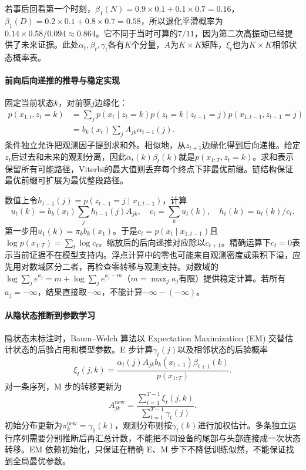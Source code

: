 若事后回看第一个时刻，$\beta_1(N)=0.9\times0.1+0.1\times0.7=0.16$，$\beta_1(D)=0.2\times0.1+0.8\times0.7=0.58$，所以退化平滑概率为$0.14\times0.58/0.094\approx0.864$。它不同于当时可算的$7/11$，因为第二次高振动已经提供了未来证据。此处$\alpha_t,\beta_t,\gamma_t$各有$K$个分量，$A$为$K\times K$矩阵，$\xi_t$也为$K\times K$相邻状态概率表。

\paragraph{前向后向递推的推导与稳定实现}
固定当前状态$k$，对前驱$j$边缘化：
\begin{align}
 p(x_{1:t},z_t=k)
 &=\sum_jp(x_t\mid z_t=k)p(z_t=k\mid z_{t-1}=j)
             p(x_{1:t-1},z_{t-1}=j)\\
 &=b_k(x_t)\sum_jA_{jk}\alpha_{t-1}(j).
\end{align}
条件独立允许把观测因子提到求和外。相似地，从$z_{t+1}$边缘化得到后向递推。给定$z_t$后过去和未来的观测分离，因此$\alpha_t(k)\beta_t(k)$就是$p(x_{1:T},z_t=k)$。求和表示保留所有可能路径，Viterbi的最大值则丢弃每个终点下非最优前缀。链结构保证最优前缀可扩展为最优整段路径。

数值上令$h_{t-1}(j)=p(z_{t-1}=j\mid x_{1:t-1})$，计算
\begin{equation}
 u_t(k)=b_k(x_t)\sum_jh_{t-1}(j)A_{jk},\quad
 c_t=\sum_ku_t(k),\quad h_t(k)=u_t(k)/c_t.
\end{equation}
第一步用$u_1(k)=\pi_kb_k(x_1)$。于是$c_t=p(x_t\mid x_{1:t-1})$且$\log p(x_{1:T})=\sum_t\log c_t$。缩放后的后向递推对应除以$c_{t+1}$。精确运算下$c_t=0$表示当前证据不在模型支持内。浮点计算中的零也可能来自观测密度或乘积下溢，应先用对数域区分二者，再检查零转移与观测支持。对数域的$\log\sum_j e^{a_j}=m+\log\sum_je^{a_j-m}$（$m=\max_ja_j$有限）提供稳定计算。若所有$a_j=-\infty$，结果直接取$-\infty$，不能计算$-\infty-(-\infty)$。

\paragraph{从隐状态推断到参数学习}
隐状态未标注时，Baum--Welch 算法以 Expectation Maximization (EM) 交替估计状态的后验占用和模型参数。E 步计算$\gamma_t(j)$以及相邻状态的后验概率
\begin{equation}
 \xi_t(j,k)=\frac{\alpha_t(j)A_{jk}b_k(x_{t+1})\beta_{t+1}(k)}{p(x_{1:T})}.
\end{equation}
对一条序列，M 步的转移更新为
\begin{equation}
 A_{jk}^{\mathrm{new}}=
 \frac{\sum_{t=1}^{T-1}\xi_t(j,k)}{\sum_{t=1}^{T-1}\gamma_t(j)}.
\end{equation}
初始分布更新为$\pi_k^{\mathrm{new}}=\gamma_1(k)$，观测分布则按$\gamma_t(k)$进行加权估计。多条独立运行序列需要分别推断后再汇总计数，不能把不同设备的尾部与头部连接成一次状态转移。EM 依赖初始化，只保证在精确 E、M 步下不降低训练似然，不能保证找到全局最优参数。

